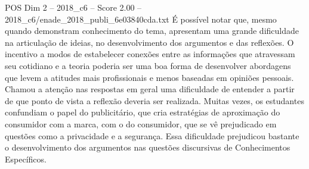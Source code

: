 \begin{textsample}{POS Dim 2 – 2018\_c6 – Score 2.00 – 2018\_c6/enade\_2018\_publi\_6e03840cda.txt}
É possível notar que, mesmo quando demonstram conhecimento do tema, apresentam uma grande dificuldade na articulação de ideias, no desenvolvimento dos argumentos e das reflexões.
O incentivo a modos de estabelecer conexões entre as informações que atravessam seu cotidiano e a teoria poderia ser uma boa forma de desenvolver abordagens que levem a atitudes mais profissionais e menos baseadas em opiniões pessoais.
Chamou a atenção nas respostas em geral uma dificuldade de entender a partir de que ponto de vista a reflexão deveria ser realizada.
Muitas vezes, os estudantes confundiam o papel do publicitário, que cria estratégias de aproximação do consumidor com a marca, com o do consumidor, que se vê prejudicado em questões como a privacidade e a segurança.
Essa dificuldade prejudicou bastante o desenvolvimento dos argumentos nas questões discursivas de Conhecimentos Específicos.

\end{textsample}
